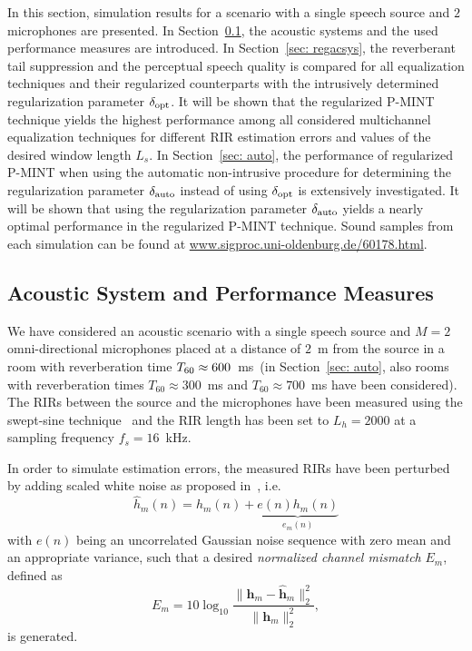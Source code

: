 \documentclass[10pt]{IEEEtran}
\begin{document}
In this section, simulation results for a scenario with a single speech source and $2$ microphones are presented.
In Section~\ref{sec: acsys}, the acoustic systems and the used performance measures are introduced.
In Section~\ref{sec: regacsys}, the reverberant tail suppression and the perceptual speech quality is compared for all equalization techniques and their regularized counterparts with the intrusively determined regularization parameter $\delta_{\rm opt}$.
It will be shown that the regularized P-MINT technique yields the highest performance among all considered multichannel equalization techniques for different RIR estimation errors and values of the desired window length $L_s$.
In Section~\ref{sec: auto}, the performance of regularized P-MINT when using the automatic non-intrusive procedure for determining the regularization parameter $\delta_{\rm auto}$ instead of using $\delta_{\rm opt}$ is extensively investigated.
It will be shown that using the regularization parameter $\delta_{\rm auto}$ yields a nearly optimal performance in the regularized P-MINT technique.
Sound samples from each simulation can be found at {\small \url{www.sigproc.uni-oldenburg.de/60178.html}}.

\subsection{Acoustic System and Performance Measures}
\label{sec: acsys}

We have considered an acoustic scenario with a single speech source and $M=2$ omni-directional microphones placed at a distance of $2$~m from the source in a room with reverberation time $T_{\rm 60} \approx 600$~ms~(in Section~\ref{sec: auto}, also rooms with reverberation times $T_{60} \approx 300$~ms and $T_{60} \approx 700$~ms have been considered).
The RIRs between the source and the microphones have been measured using the swept-sine technique~\cite{Farina_2000} and the RIR length has been set to $L_h = 2000$ at a sampling frequency $f_s = 16$~kHz.

In order to simulate estimation errors, the measured RIRs have been perturbed by adding scaled white noise as proposed in~\cite{Cho_ITSA_1999}, i.e.
\begin{equation}
  \hat{h}_m(n) = h_m(n) + \underbrace{e(n)h_m(n)}_{e_m(n)}
\end{equation}
with $e(n)$ being an uncorrelated Gaussian noise sequence with zero mean and an appropriate variance, such that a desired \emph{normalized channel mismatch} $E_m$, defined as
\begin{equation}
E_m = 10 \log_{10} \frac{\|\mathbf{h}_m - \hat{\mathbf{h}}_m \|_2^2}{\|\mathbf{h}_m\|_2^2},
\end{equation}
is generated.
\end{document}

